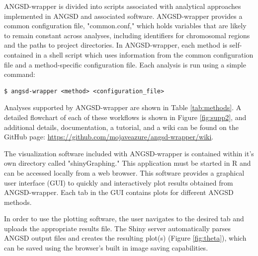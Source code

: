 \documentclass[10pt,a4paper]{article}
\begin{document}
ANGSD-wrapper is divided into scripts associated with analytical approaches implemented in ANGSD and associated software. 
ANGSD-wrapper provides a common configuration file, "common.conf," which  holds variables that are likely to remain constant across analyses, including identifiers for chromosomal regions and the paths to project directories.
In ANGSD-wrapper, each method is self-contained in a shell script which uses information from the common configuration file and a method-specific configuration file. 
Each analysis is run using a simple command:

\begin{lstlisting}
$ angsd-wrapper <method> <configuration_file>
\end{lstlisting}

Analyses supported by ANGSD-wrapper are shown in Table \ref{tab:methods}.
A detailed flowchart of each of these workflows is shown in Figure \ref{fig:supp2}, and additional details, documentation, a tutorial, and a wiki can be found on the GitHub page: \url{https://github.com/mojaveazure/angsd-wrapper/wiki}.

The visualization software included with ANGSD-wrapper is contained within it's own directory called "shinyGraphing."
This application must be started in R and can be accessed locally from a web browser. 
This software provides a graphical user interface (GUI) to quickly and interactively plot results obtained from ANGSD-wrapper.  
Each tab in the GUI contains plots for different ANGSD methods.

In order to use the plotting software, the user navigates to the desired tab and uploads the appropriate results file. 
The Shiny server automatically parses ANGSD output files and creates the resulting plot(s) (Figure \ref{fig:theta}), which can be saved using the browser's built in image saving capabilities.
\end{document}

